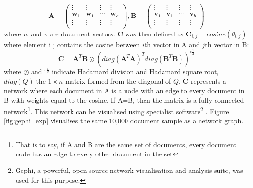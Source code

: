 $$\mathbf{A} = \left( \begin{array}{cccc}
\vdots & \vdots & \vdots & \vdots \\
\mathbf{w}_1 & \mathbf{w}_1 & \cdots & \mathbf{w}_a \\
\vdots & \vdots & \vdots & \vdots \\ \end{array} \right) , \mathbf{B} = \left( \begin{array}{cccc}
\vdots & \vdots & \vdots & \vdots \\
\mathbf{v}_1 & \mathbf{v}_1 & \cdots & \mathbf{v}_b \\
\vdots & \vdots & \vdots & \vdots \\ \end{array} \right)$$ where $w$ and $v$ are document vectors.
$\mathbf{C}$ was then defined as $\mathbf{C}_{i , j} = cosine \left(\theta_{i , j} \right)$ where element i j contains the cosine between $i$th vector in A and $j$th vector in B:
$$\mathbf{C}=\mathbf{A}^T \mathbf{B} \oslash \left( diag(\mathbf{A}^T \mathbf{A})^T diag(\mathbf{B}^T \mathbf{B}) \right)^{\circ\frac12}$$
where $\oslash$ and $^{\circ\frac12}$ indicate Hadamard division and Hadamard square root, $diag(Q)$ the $1 \times n$ matrix formed from the diagonal of $Q$. $\mathbf{C}$ represents a network where each document in A is a node with an edge to every document in B with weights equal to the cosine. If A=B, then the matrix is a fully connected network\footnote{That is to say, if A and B are the same set of documents, every document node has an edge to every other document in the set}. This network can be visualised using specialist software\footnote{Gephi, a powerful, open source network visualisation and analysis suite, was used for this purpose. } \cite{gephi}. Figure \ref{fig:gephi_exp} visualises the same 10,000 document sample as a network graph.
